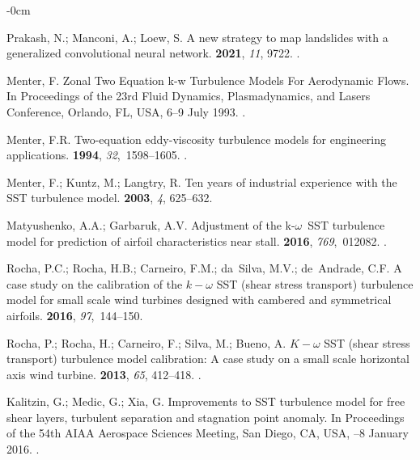 \documentclass[mathematics,article,accept,pdftex,moreauthors]{Definitions/mdpi}
\begin{document}
\begin{adjustwidth}{-\extralength}{0cm}
\begin{thebibliography}{999}
Prakash, N.; Manconi, A.; Loew, S.
\newblock A new strategy to map landslides with a generalized convolutional
  neural network.
 {\bf 2021}, {\em 11}, 9722.
.

Menter, F. Zonal Two Equation k-w Turbulence Models For Aerodynamic Flows.
\newblock  In  Proceedings of the    23rd Fluid Dynamics, Plasmadynamics, and Lasers Conference,  Orlando, FL, USA,  6--9 July 1993.
.

Menter, F.R.
\newblock Two-equation eddy-viscosity turbulence models for engineering
  applications.
 {\bf 1994}, {\em 32},~1598--1605.
.

Menter, F.; Kuntz, M.; Langtry, R.
\newblock Ten years of industrial experience with the SST turbulence model.
 {\bf 2003}, {\em 4}, 625--632.

Matyushenko, A.A.; Garbaruk, A.V.
\newblock Adjustment of the k-$\omega$~SST turbulence model for prediction of
  airfoil characteristics near stall.
 {\bf 2016}, {\em
  769},~012082.
.

Rocha, P.C.; Rocha, H.B.; Carneiro, F.M.; da~Silva, M.V.; de~Andrade, C.F.
\newblock A case study on the calibration of the $k-\omega$ SST (shear stress
  transport) turbulence model for small scale wind turbines designed with
  cambered and symmetrical airfoils.
 {\bf 2016}, {\em 97},~144--150.

Rocha, P.; Rocha, H.; Carneiro, F.; Silva, M.; Bueno, A.
\newblock $K-\omega$ SST (shear stress transport) turbulence model calibration:
  A case study on a small scale horizontal axis wind turbine.
 {\bf 2013}, {\em 65}, 412--418.
.

Kalitzin, G.; Medic, G.; Xia, G. Improvements to SST turbulence model for free
  shear layers, turbulent separation and stagnation point anomaly.
\newblock  In Proceedings of the   54th AIAA Aerospace Sciences Meeting, San Diego, CA, USA, --8 January 2016. 
.


\end{thebibliography}
\end{adjustwidth}
\end{document}
